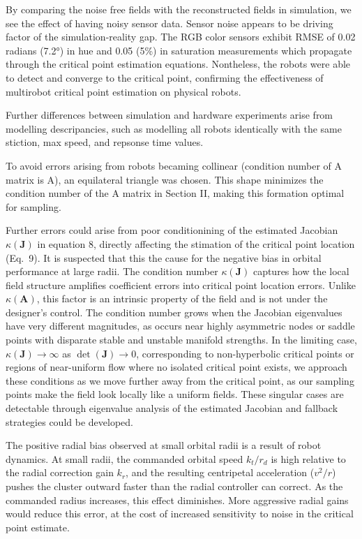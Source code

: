 \documentclass[lettersize,journal]{IEEEtran}
\begin{document}
By comparing the noise free fields with the reconstructed fields in simulation, we see the effect of having noisy sensor data. Sensor noise appears to be driving factor of the simulation-reality gap. The RGB color sensors exhibit RMSE of 0.02 radians (7.2°) in hue and 0.05 (5\%) in saturation measurements which propagate through the critical point estimation equations. Nontheless, the robots were able to detect and converge to the critical point, confirming the effectiveness of multirobot critical point estimation on physical robots.

Further differences between simulation and hardware experiments arise from modelling descripancies, such as modelling all robots identically with the same stiction, max speed, and repsonse time values. 

To avoid errors arising from robots becaming collinear (condition number of A matrix is A), an equilateral triangle was chosen. This shape minimizes the condition number of the A matrix in Section II, making this formation optimal for sampling.

Further errors could arise from poor conditionining of the estimated Jacobian $\kappa(\mathbf{J})$ in equation 8, directly affecting the stimation of  the critical point location (Eq.~9). It is suspected that this the cause for the negative bias in orbital performance at large radii. The condition number $\kappa(\mathbf{J})$ captures how the local field structure amplifies coefficient errors into critical point location errors. Unlike $\kappa(\mathbf{A})$, this factor is an intrinsic property of the field and is not under the designer's control. The condition number grows when the Jacobian eigenvalues have very different magnitudes, as occurs near highly asymmetric nodes or saddle points with disparate stable and unstable manifold strengths. In the limiting case, $\kappa(\mathbf{J}) \to \infty$ as $\det(\mathbf{J}) \to 0$, corresponding to non-hyperbolic critical points or regions of near-uniform flow where no isolated critical point exists, we approach these conditions as we move further away from the critical point, as our sampling points make the field look locally like a uniform fields. These singular cases are detectable through eigenvalue analysis of the estimated Jacobian and fallback strategies could be developed.

The positive radial bias observed at small orbital radii is a result of robot dynamics. At small radii, the commanded orbital speed $k_t / r_d$ is high relative to the radial correction gain $k_r$, and the resulting centripetal acceleration ($v^2 / r$) pushes the cluster outward faster than the radial controller can correct. As the commanded radius increases, this effect diminishes. More aggressive radial gains would reduce this error, at the cost of increased sensitivity to noise in the critical point estimate.
\end{document}
